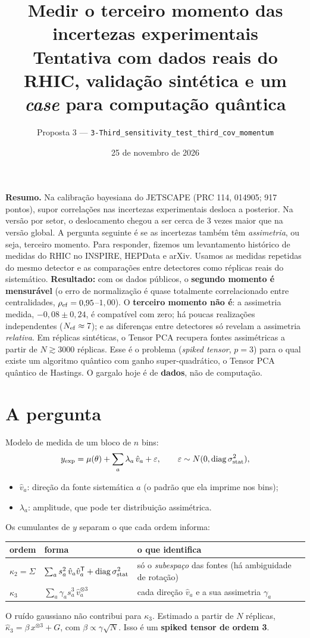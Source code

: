 \documentclass[11pt,a4paper]{article}
\title{Medir o terceiro momento das incertezas experimentais\\
\large Tentativa com dados reais do RHIC, validação sintética e um \emph{case} para computação quântica}
\date{25 de novembro de 2026}
\author{Proposta 3 --- \texttt{3-Third\_sensitivity\_test\_third\_cov\_momentum}}
\newcommand{\vhat}{\hat v}
\newcommand{\kthree}{\kappa_3}
\newcommand{\caixa}[2]{\par\noindent\colorbox{#1}{\parbox{\dimexpr\linewidth-2\fboxsep}{#2}}\par}
\begin{document}
\maketitle
\vspace{-1.5em}

\caixa{blue!6}{\textbf{Resumo.} Na calibração bayesiana do JETSCAPE (PRC 114, 014905; 917 pontos), supor correlações nas incertezas
experimentais desloca a posterior. Na versão por setor, o deslocamento chegou a ser cerca de 3 vezes maior que na versão global.
A pergunta seguinte é se as incertezas também têm \emph{assimetria}, ou seja, terceiro momento. Para responder, fizemos um levantamento
histórico de medidas do RHIC no INSPIRE, HEPData e arXiv. Usamos as medidas repetidas do mesmo detector e as comparações entre
detectores como réplicas reais do sistemático.
\textbf{Resultado:} com os dados públicos, o \textbf{segundo momento é mensurável} (o erro de normalização é quase totalmente correlacionado
entre centralidades, $\rho_{\rm ef}=0{,}95$--$1{,}00$). O \textbf{terceiro momento não é}: a assimetria medida, $-0{,}08\pm0{,}24$, é compatível
com zero; há poucas realizações independentes ($N_{\rm ef}\approx7$); e as diferenças entre detectores só revelam a assimetria \emph{relativa}.
Em réplicas sintéticas, o Tensor PCA recupera fontes assimétricas a partir de $N\gtrsim3000$ réplicas. Esse é o problema
(\emph{spiked tensor}, $p=3$) para o qual existe um algoritmo quântico com ganho super-quadrático, o Tensor PCA quântico de Hastings.
O gargalo hoje é de \textbf{dados}, não de computação.}

\section{A pergunta}
Modelo de medida de um bloco de $n$ bins:
\[
y_{\rm exp}=\mu(\theta)+\sum_{a}\lambda_a\,\vhat_a+\varepsilon,\qquad \varepsilon\sim N(0,\mathrm{diag}\,\sigma^2_{\rm stat}),
\]
\begin{itemize}[nosep]
\item $\vhat_a$: direção da fonte sistemática $a$ (o padrão que ela imprime nos bins);
\item $\lambda_a$: amplitude, que pode ter distribuição assimétrica.
\end{itemize}
Os cumulantes de $y$ separam o que cada ordem informa:
\begin{center}
\begin{tabular}{@{}lll@{}}
\toprule
ordem & forma & o que identifica \\
\midrule
$\kappa_2=\Sigma$ & $\sum_a s_a^2\,\vhat_a\vhat_a^{\mathsf T}+\mathrm{diag}\,\sigma^2_{\rm stat}$ & só o \emph{subespaço} das fontes (há ambiguidade de rotação) \\
$\kthree$ & $\sum_a \gamma_a s_a^3\,\vhat_a^{\otimes3}$ & cada direção $\vhat_a$ e a sua assimetria $\gamma_a$ \\
\bottomrule
\end{tabular}
\end{center}
O ruído gaussiano não contribui para $\kthree$. Estimado a partir de $N$ réplicas, $\hat\kappa_3=\beta\,x^{\otimes3}+G$, com $\beta\propto\gamma\sqrt N$.
Isso é um \textbf{spiked tensor de ordem 3}.
\end{document}
